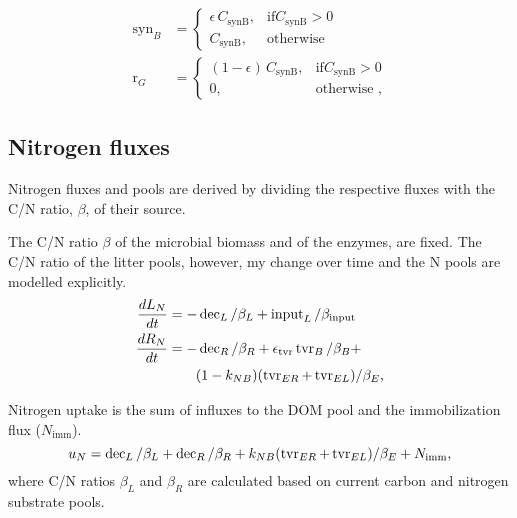 \begin{subequations}
\label{eq:synB}
\begin{align}
\operatorname{syn}_B &= \begin{cases}
  \epsilon \, C_{\operatorname{synB}},  & \text{if} C_{\operatorname{synB}} >
  0\\
  C_{\operatorname{synB}}, & \text{otherwise}
\end{cases} \\  
\operatorname{r}_G &= \begin{cases}
  (1 - \epsilon) \, C_{\operatorname{synB}},  & \text{if}
  C_{\operatorname{synB}} > 0\\
  0, & \text{otherwise ,}
\end{cases}  
\end{align}
\end{subequations}



\subsection{Nitrogen fluxes}
Nitrogen fluxes and pools are derived by dividing the respective fluxes with the
C/N ratio, $\beta$, of their source.

The C/N ratio $\beta$ of the microbial biomass and of the enzymes,
are fixed. The C/N ratio of the litter pools, however, my change over time and
the N pools are modelled explicitly.
\begin{subequations}
\label{eq:SEAMN}
\begin{align}
\frac{dL_N}{dt} &=  - \operatorname{dec}_L /\beta_{L} +
\operatorname{input}_L/\beta_{\operatorname{input}} \\
\frac{dR_N}{dt} &=  - \operatorname{dec}_R /\beta_{R} +
\epsilon_{\operatorname{tvr}} \operatorname{tvr}_B /\beta_{B} + \notag \\
& \qquad (1 -k_{NB}) (\operatorname{tvr}_{ER} +
\operatorname{tvr}_{EL})/\beta_{E}  
\text{,} 
\end{align}
\end{subequations}

Nitrogen uptake is the sum of influxes to the DOM pool and the immobilization
flux ($N_{\operatorname{imm}}$).
\begin{equation}
\label{eq:uN}
u_N = \operatorname{dec}_L/\beta_L + \operatorname{dec}_R/\beta_R +  k_{NB}
(\operatorname{tvr}_{ER} + \operatorname{tvr}_{EL})/\beta_E 
\\
+ N_{\operatorname{imm}}
\text{,}
\end{equation}
where C/N ratios $\beta_L$ and $\beta_R$ are calculated based on current carbon
and nitrogen substrate pools.

